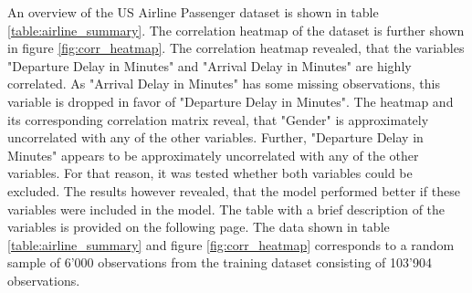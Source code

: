   \noindent An overview of the US Airline Passenger dataset is shown in table
  \ref{table:airline_summary}. The correlation heatmap of the dataset is
  further shown in figure \ref{fig:corr_heatmap}. The correlation heatmap
  revealed, that the variables "Departure Delay in Minutes" and "Arrival Delay
  in Minutes" are highly correlated. As "Arrival Delay in Minutes" has some
  missing observations, this variable is dropped in favor of "Departure Delay 
  in Minutes". The heatmap and its corresponding correlation matrix reveal,
  that "Gender" is approximately uncorrelated with any of the other variables.
  Further, "Departure Delay in Minutes" appears to be approximately
  uncorrelated with any of the other variables. For that reason, it was tested
  whether both variables could be excluded. The results however revealed, that
  the model performed better if these variables were included in the model. The
  table with a brief description of the variables is provided on the following
  page. The data shown in table \ref{table:airline_summary} and figure
  \ref{fig:corr_heatmap} corresponds to a random sample of 6’000 observations 
  from the training dataset consisting of 103’904 observations.

